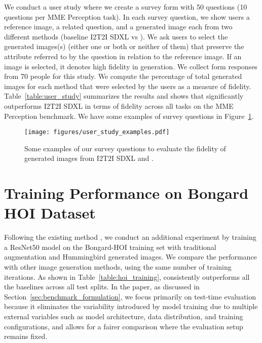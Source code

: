 We conduct a user study where we create a survey form with 50 questions (10 questions per MME Perception task). In each survey question, we show users a reference image, a related question, and a generated image each from two different methods (baseline I2T2I SDXL vs \method). We ask users to select the generated images(s) (either one or both or neither of them) that preserve the attribute referred to by the question in relation to the reference image. If an image is selected, it denotes high fidelity in generation. We collect form responses from 70 people for this study. We compute the percentage of total generated images for each method that were selected by the users as a measure of fidelity. Table~\ref{table:user_study} summarizes the results and shows that \method significantly outperforms I2T2I SDXL in terms of fidelity across all tasks on the MME Perception benchmark. We have some examples of survey questions in Figure~\ref{fig:user_study_examples}.


\begin{figure}[!h]
    \centering
    \texttt{[image: figures/user\_study\_examples.pdf]}
    \caption{Some examples of our survey questions to evaluate the fidelity of generated images from I2T2I SDXL and \method.}
    \label{fig:user_study_examples}
\end{figure}
\section{Training Performance on Bongard HOI Dataset}

Following the existing method \citep{shu2022testtime}, we conduct an additional experiment by training a ResNet50 \citep{he2016deep} model on the Bongard-HOI \citep{jiang2022bongard} training set with traditional augmentation and Hummingbird generated images. We compare the performance with other image generation methods, using the same
number of training iterations. As shown in Table~\ref{table:hoi_training}, \method consistently outperforms all the baselines across all test splits. In the paper, as discussed in Section~\ref{sec:benchmark_formulation}, we focus primarily on test-time evaluation because it eliminates the variability introduced by model training due to multiple external variables such as model architecture, data distribution, and training configurations, and allows for a fairer comparison where the evaluation setup remains fixed.



